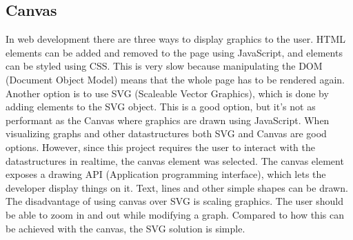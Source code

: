 \subsection{Canvas}
In web development there are three ways to display graphics to the user. HTML elements can be added and removed to the page using JavaScript, and elements can be styled using CSS. This is very slow because manipulating the DOM (Document Object Model) means that the whole page has to be rendered again. Another option is to use SVG (Scaleable Vector Graphics), which is done by adding elements to the SVG object. This is a good option, but it's not as performant as the Canvas where graphics are drawn using JavaScript. When visualizing graphs and other datastructures both SVG and Canvas are good options. However, since this project requires the user to interact with the datastructures in realtime, the canvas element was selected. The canvas element exposes a drawing API (Application programming interface), which lets the developer display things on it. Text, lines and other simple shapes can be drawn. The disadvantage of using canvas over SVG is scaling graphics. The user should be able to zoom in and out while modifying a graph. Compared to how this can be achieved with the canvas, the SVG solution is simple.